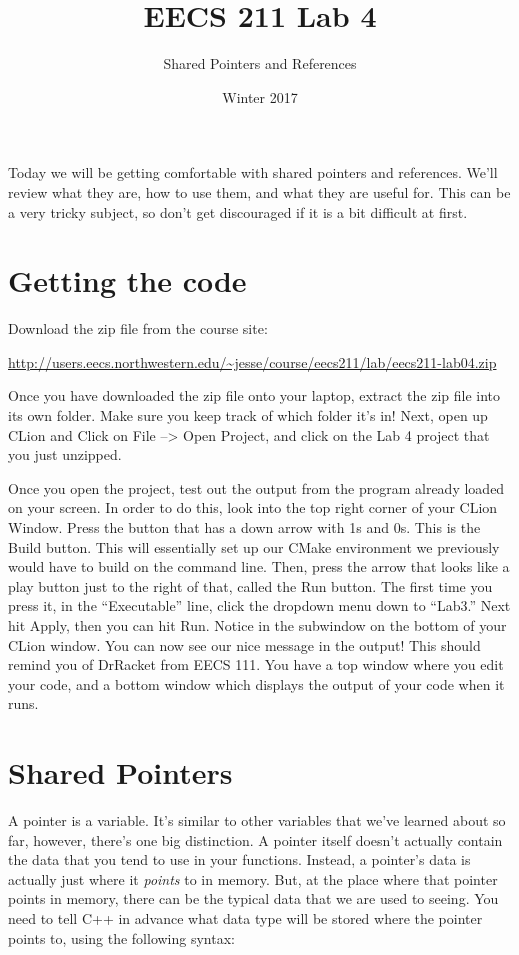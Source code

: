 \documentclass{tufte-handout}
\title{EECS 211 Lab 4}
\author{Shared Pointers and References}
\date{Winter 2017}
\begin{document}
\maketitle

Today we will be getting comfortable with shared pointers and references. We'll review what they are, how to use them, and what they are useful for.  This can be a very tricky subject, so don't get discouraged if it is a bit difficult at first.

\section{Getting the code}
Download the zip file from the course site: \medskip

\url{http://users.eecs.northwestern.edu/~jesse/course/eecs211/lab/eecs211-lab04.zip} \medskip

\noindent
Once you have downloaded the zip file onto your laptop, extract the zip file into its own folder. Make sure you keep track of which folder it's in!  Next, open up CLion and Click on File --> Open Project, and click on the Lab 4 project that you just unzipped. 

Once you open the project, test out the output from the program already loaded on your screen.  In order to do this, look into the top right corner of your CLion Window.  Press the button that has a down arrow with 1s and 0s.  This is the Build button.  This will essentially set up our CMake environment we previously would have to build on the command line. Then, press the arrow that looks like a play button just to the right of that, called the Run button.  The first time you press it, in the ``Executable'' line, click the dropdown menu down to ``Lab3.''  Next hit Apply, then you can hit Run.  Notice in the subwindow on the bottom of your CLion window. You can now see our nice message in the output! This should remind you of DrRacket from EECS 111. You have a top window where you edit your code, and a bottom window which displays the output of your code when it runs.


\section{Shared Pointers}
A pointer is a variable. 
It's similar to other variables that we've learned about so far, however, there's one big distinction. 
A pointer itself doesn't actually contain the data that you tend to use in your functions.  
Instead, a pointer's data is actually just where it \textit{points} to in memory.
But, at the place where that pointer points in memory, there can be the typical data that we are used to seeing.  
You need to tell C++ in advance what data type will be stored where the pointer points to, using the following syntax:
\end{document}
